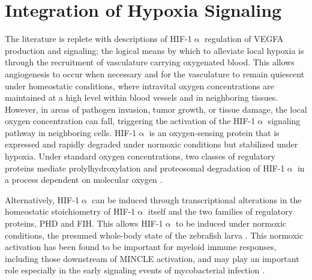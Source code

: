 \section{Integration of Hypoxia Signaling}\label{hypoxia}

The literature is replete with descriptions of HIF\hyp{}1$\upalpha$ regulation of VEGFA production and signaling; the logical means by which to alleviate local hypoxia is through the recruitment of vasculature carrying oxygenated blood. This allows angiogenesis to occur when necessary and for the vasculature to remain quiescent under homeostatic conditions, where intravital oxygen concentrations are maintained at a high level within blood vessels and in neighboring tissues. However, in areas of pathogen invasion, tumor growth, or tissue damage, the local oxygen concentration can fall, triggering the activation of the HIF\hyp{}1$\upalpha$ signaling pathway in neighboring cells. HIF\hyp{}1$\upalpha$ is an oxygen\hyp{}sensing protein that is expressed and rapidly degraded under normoxic conditions but stabilized under hypoxia. Under standard oxygen concentrations, two classes of regulatory proteins mediate prolylhydroxylation and proteosomal degradation of HIF\hyp{}1$\upalpha$ in a process dependent on molecular oxygen \citep{Corcoran2016, Hong2004, Masoud2015}.

Alternatively, HIF\hyp{}1$\upalpha$ can be induced through transcriptional alterations in the homeostatic stoichiometry of HIF\hyp{}1$\upalpha$ itself and the two families of regulatory proteins, PHD and FIH. This allows HIF\hyp{}1$\upalpha$ to be induced under normoxic conditions, the presumed whole\hyp{}body state of the zebrafish larva \citep{Ellertsdottir2010}. This normoxic activation has been found to be important for myeloid immune responses, including those downstream of MINCLE activation, and may play an important role especially in the early signaling events of mycobacterial infection \citep{Nishi2008, Schatz2016, Schoenen2014, Thompson2017}. 

